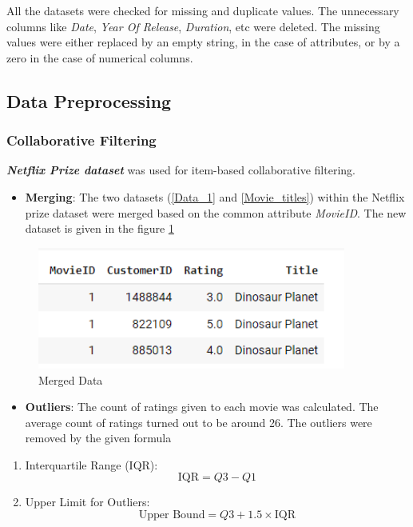 \documentclass[a4paper,10pt]{article}
\begin{document}
All the datasets were checked for missing and duplicate values. 
The unnecessary columns like \textit{Date}, \textit{Year Of Release}, \textit{Duration}, etc were deleted. The missing values were either replaced by an empty string, in the case of attributes, or by a zero in the case of numerical columns.  


\subsection{Data Preprocessing}

\subsubsection{Collaborative Filtering}
\textit{\textbf{Netflix Prize dataset}} was used for item-based collaborative filtering. 
\begin{itemize}
    \item \textbf{Merging}: The two datasets (\ref{Data_1} and \ref{Movie_titles}) within the Netflix prize dataset were merged based on the common attribute \textit{MovieID}. The new dataset is given in the figure \ref{Movie_merge}
\end{itemize}

\begin{figure}[H]
\centering
\includegraphics[height=4cm]{figures/movie_data.png}
\caption{Merged Data}
\label{Movie_merge}
\end{figure}


\begin{itemize}
    \item \textbf{Outliers}: The count of ratings given to each movie was calculated. The average count of ratings turned out to be around 26. The outliers were removed by the given formula 
\end{itemize}

\begin{enumerate}
  \item Interquartile Range (IQR):
    \[ \text{IQR} = Q3 - Q1 \]

  \item Upper Limit for Outliers:
    \[ \text{Upper Bound} = Q3 + 1.5 \times \text{IQR} \]
\end{enumerate}
\end{document}
